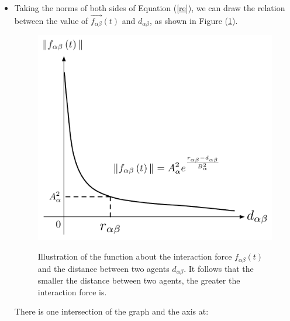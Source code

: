\begin{itemize}




\item Taking the norms of both sides of Equation (\ref{re}), we can draw the relation between the value of $\overrightarrow{f_{\alpha\beta}}(t)$ and $ d_{\alpha\beta} $, as shown in Figure 
(\ref{fig:physicalinteraction2}).\\

\begin{figure}
    \centering
    {\includegraphics[scale=0.45]{Figures/physicalinteraction.pdf}} 
    \caption[Psysical interaction]{Illustration of the function about the interaction force 
        $f_{\alpha\beta}(t)$ and the distance between two agents
        $d_{\alpha \beta}$. It follows that the smaller the distance between two agents, the greater the interaction force is. }
    \label{fig:physicalinteraction2}
\end{figure}

There is one intersection of the graph and the  axis at:


\end{itemize}

